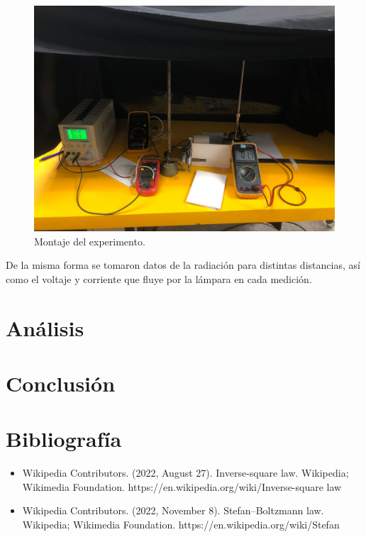 \documentclass[a4paper,twocolumn,10pt]{article}
\begin{document}
\begin{figure}[H]
    \centering
    \includegraphics[scale=.12]{Imagenes/ISL_SB/montaje.png}
    \caption{Montaje del experimento.}
    \label{fig:my_label}
\end{figure}

De la misma forma se tomaron datos de la radiación para distintas distancias, así como el voltaje y corriente que fluye por la lámpara en cada medición.


\section{Análisis}



\section{Conclusión}
\section{Bibliografía}


\begin{itemize}
\item Wikipedia Contributors. (2022, August 27). Inverse-square law. Wikipedia; Wikimedia Foundation. https://en.wikipedia.org/wiki/Inverse-square law
\item Wikipedia Contributors. (2022, November 8). Stefan–Boltzmann law. Wikipedia; Wikimedia Foundation. https://en.wikipedia.org/wiki/Stefan%

‌

\end{itemize}
\end{document}
